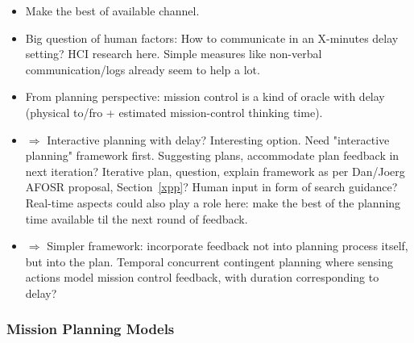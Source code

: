 \begin{itemize}

\item Make the best of available channel.
    
\item Big question of human factors: How to communicate in an
  X-minutes delay setting? HCI research here. Simple measures like
  non-verbal communication/logs already seem to help a lot.
    
\item From planning perspective: mission control is a kind of oracle
  with delay (physical to/fro + estimated mission-control thinking
  time).
    
\item $\Rightarrow$ Interactive planning with delay? Interesting
  option. Need "interactive planning" framework first. Suggesting
  plans, accommodate plan feedback in next iteration? Iterative plan,
  question, explain framework as per Dan/Joerg AFOSR proposal,
  Section~\ref{xpp}? Human input in form of search guidance? Real-time
  aspects could also play a role here: make the best of the planning
  time available til the next round of feedback.
    
\item $\Rightarrow$ Simpler framework: incorporate feedback not into
  planning process itself, but into the plan. Temporal concurrent
  contingent planning where sensing actions model mission control
  feedback, with duration corresponding to delay?
    
\end{itemize}



\subsubsection{Mission Planning Models}


